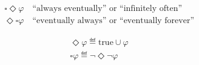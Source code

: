 



\begin{align*}
    &\square\Diamond\varphi \quad \text{``always eventually'' or ``infinitely often''}\\
    &\Diamond\square\varphi \quad \text{``eventually always'' or ``eventually forever''}
\end{align*}



\begin{align*}
    &\Diamond \varphi \eqdef \text{true} \cup \varphi \\
    &\square \varphi \eqdef \neg \Diamond \neg \varphi \\
\end{align*}


